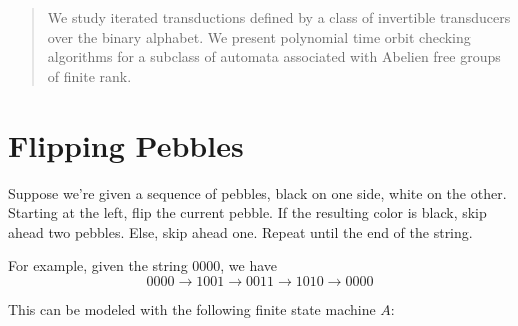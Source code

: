 \documentclass[a0,landscape, 16pt]{a0poster}
\theoremstyle{pleasant}
\newcommand{\0}{\underline{0}}
\newcommand{\1}{\underline{1}}
\newcommand{\2}{\underline{2}}
\begin{document}
\begin{multicols}{3} %



\begin{abstract}
\large
We study iterated transductions defined by a class of invertible transducers over the binary alphabet. We present polynomial time orbit checking algorithms for a subclass of automata associated with Abelien free groups of finite rank.
\end{abstract}



\section*{Flipping Pebbles}

\Large
Suppose we're given a sequence of pebbles, black on one side, white on the other. Starting at the left, flip the current pebble. If the resulting color is black, skip ahead two pebbles. Else, skip ahead one. Repeat until the end of the string.

For example, given the string 0000, we have
$$0000 \rightarrow 1001 \rightarrow 0011 \rightarrow 1010\rightarrow 0000$$

This can be modeled with the following finite state machine $A$:\\


\end{multicols}
\end{document}
